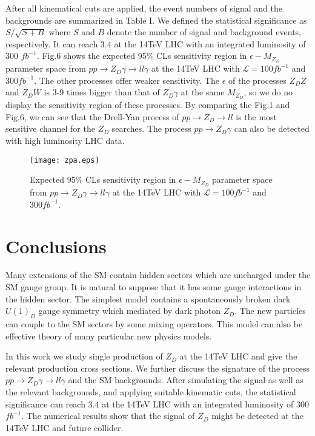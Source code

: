 \documentclass{article}
\begin{document}
 After all kinematical cuts are applied, the event numbers of signal and the backgrounds are summarized in Table I. We defined the statistical significance as $S/\sqrt{S+B}$ where $S$ and
$B$ denote the number of signal and background events, respectively. It can reach 3.4 at the 14TeV LHC with an integrated luminosity of 300 $fb^{-1}$. Fig.6 shows the expected 95\% CLs sensitivity region in $\epsilon - M_{Z_D}$ parameter space from $pp\rightarrow Z_D\gamma \rightarrow ll\gamma$ at the 14TeV LHC with $\mathcal{L}=100 fb^{-1}$ and $300 fb^{-1}$. The other processes offer weaker sensitivity. The $\epsilon$ of the processes $Z_DZ$ and $Z_DW$ is 3-9 times bigger than that of $Z_D\gamma$ at the same $M_{Z_D}$, so we do no display the sensitivity region of these processes. By comparing the Fig.1 and Fig.6, we can see that the Drell-Yan process of $pp\rightarrow Z_D\rightarrow ll$ is the most sensitive channel for the $Z_D$ searches. The process $pp\rightarrow Z_D \gamma$  can also be detected with high luminosity LHC data.




\begin{figure}
\begin{center}
\texttt{[image: zpa.eps]}
\caption{Expected 95\% CLs sensitivity region in $\epsilon - M_{Z_D}$ parameter space from $pp\rightarrow Z_D\gamma \rightarrow ll\gamma$ at the 14TeV LHC with $\mathcal{L}=100 fb^{-1}$ and $300 fb^{-1}$.}
\end{center}
\end{figure}


\section{Conclusions}
	Many extensions of the SM contain hidden sectors which are uncharged under the SM gauge group. It is natural to suppose that it has some gauge interactions in the hidden sector.
The simplest model  contains a spontaneously broken dark  $U\left ( 1 \right )_{D}$ gauge symmetry which mediated by dark photon $Z_D$.  The new particles  can couple to the SM sectors by some mixing operators. This model can also be effective theory of many particular new physics models.
	
	 In this work we study single production of $Z_D$ at the 14TeV LHC and give the relevant production cross sections. 	We further discuss the signature of the process $pp\rightarrow Z_D\gamma \rightarrow ll\gamma$ and the SM backgrounds. After simulating the signal as well as the relevant backgrounds, and applying suitable kinematic cuts, the statistical significance can reach 3.4 at the 14TeV LHC with an integrated luminosity of 300 $fb^{-1}$. The numerical results show that the signal of $Z_D$ might be detected at the 14TeV LHC and future collider.
	
\end{document}
